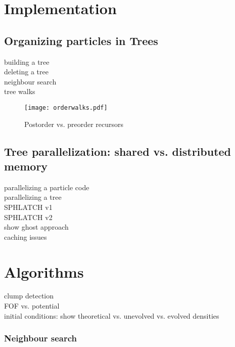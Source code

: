 \section{Implementation}
\subsection{Organizing particles in Trees}
building a tree\\
deleting a tree\\
neighbour search\\
tree walks\\


\begin{figure}[htbp]
\begin{center}
\texttt{[image: orderwalks.pdf]}
\caption{Postorder vs. preorder recursors}
\label{fig02walks}
\end{center}
\end{figure}


\subsection{Tree parallelization: shared vs. distributed memory}
parallelizing a particle code\\
parallelizing a tree\\
SPHLATCH v1\\
SPHLATCH v2\\

show ghost approach\\
caching issues\\

\section{Algorithms}
clump detection\\
FOF vs. potential\\
initial conditions: show theoretical vs. unevolved vs. evolved densities\\


\subsubsection{Neighbour search}

\citep{Barnes:1986p2853}
\citep{Monaghan:2005p2677}
